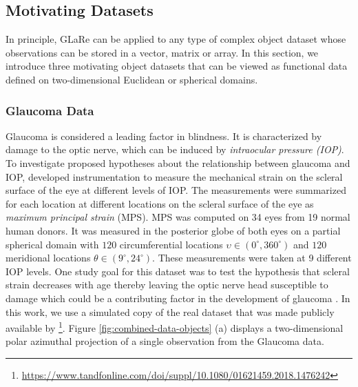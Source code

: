 \subsection{Motivating Datasets}\label{sec:motivating-datasets}

In principle, GLaRe can be applied to any type of complex object dataset whose observations can be stored in a vector, matrix or array. 
In this section, we introduce three motivating object datasets that can be viewed as functional data defined on two-dimensional Euclidean or spherical domains.

\subsubsection{Glaucoma Data}

Glaucoma is considered a leading factor in blindness. It is characterized by damage to the optic nerve, which can be induced by \emph{intraocular pressure (IOP)}. 
To investigate proposed hypotheses about the relationship between glaucoma and IOP, \textcite{fazio_age-related_2014} developed instrumentation to measure the mechanical strain on the scleral surface of the eye at different levels of IOP. 
The measurements were summarized for each location at different locations on the scleral surface of the eye as \emph{maximum principal strain} (MPS). MPS was computed on 34 eyes from 19 normal human donors. It was measured in the posterior globe of both eyes on a partial spherical domain with $120$ circumferential locations $\upsilon \in (0^{\circ}, 360^{\circ})$ and $120$ meridional locations $\theta \in (9^{\circ}, 24^{\circ})$.
These measurements were taken at 9 different IOP levels.
One study goal for this dataset was to test the hypothesis that scleral strain decreases with age thereby leaving the optic nerve head susceptible to damage which could be a contributing factor in the development of glaucoma \parencite{lee_bayesian_2019}.
In this work, we use a simulated copy of the real dataset that was made publicly available by \textcite{lee_bayesian_2019}\footnote{\url{https://www.tandfonline.com/doi/suppl/10.1080/01621459.2018.1476242}}.
Figure \ref{fig:combined-data-objects} (a) displays a two-dimensional polar azimuthal projection of a single observation from the Glaucoma data.

